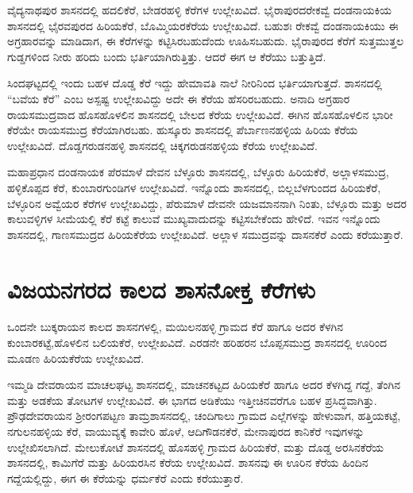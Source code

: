 ವೈದ್ಯನಾಥಪುರ ಶಾಸನದಲ್ಲಿ ಹದಲಿಕೆರೆ, ಬೇಡರಹಳ್ಳಿ ಕೆರೆಗಳ ಉಲ್ಲೇಖವಿದೆ. ಭೈರಾಪುರದ\break ರೇಕವ್ವೆ ದಂಡನಾಯಕಿಯ ಶಾಸನದಲ್ಲಿ ಭೈರವಪುರದ ಹಿರಿಯಕೆರೆ, ಬೊಮ್ಮಿಯರಕೆರೆಯ ಉಲ್ಲೇಖವಿದೆ. ಬಹುಶಃ ರೇಕವ್ವೆ ದಂಡನಾಯಕಿಯು ಈ ಅಗ್ರಹಾರವನ್ನು ಮಾಡಿದಾಗ, ಈ ಕೆರೆಗಳನ್ನು ಕಟ್ಟಿಸಿರಬಹುದೆಂದು ಊಹಿಸಬಹುದು. ಭೈರಾಪುರದ ಕೆರೆಗೆ ಸುತ್ತಮುತ್ತಲ ಗುಡ್ಡಗಳಿಂದ ನೀರು ಹರಿದು ಬಂದು ಭರ್ತಿಯಾಗಿರುತ್ತಿತ್ತು. ಆದರೆ ಈಗ ಆ ಕೆರೆಯು ಬತ್ತುತ್ತಿದೆ.

ಸಿಂದಘಟ್ಟದಲ್ಲಿ ಇಂದು ಬಹಳ ದೊಡ್ಡ ಕೆರೆ ಇದ್ದು ಹೇಮಾವತಿ ನಾಲೆ ನೀರಿನಿಂದ ಭರ್ತಿಯಾಗುತ್ತದೆ. ಶಾಸನದಲ್ಲಿ “ಬವೆಯ ಕೆರೆ” ಎಂಬ ಅಸ್ಪಷ್ಟ ಉಲ್ಲೇಖವಿದ್ದು ಅದೇ ಈ ಕೆರೆಯ ಹೆಸರಿರಬಹುದು. ಅನಾದಿ ಅಗ್ರಹಾರ ರಾಯಸಮುದ್ರವಾದ ಹೊಸಹೊಳಲಿನ ಶಾಸನದಲ್ಲಿ ಬೇಲದ ಕೆರೆಯ ಉಲ್ಲೇಖವಿದೆ. ಈಗಿನ ಹೊಸಹೊಳಲಿನ ಭಾರೀ ಕೆರೆಯೇ ರಾಯಸಮುದ್ರ ಕೆರೆಯಾಗಿರಬಹು. ಹುಸ್ಕೂರು ಶಾಸನದಲ್ಲಿ ಪೆರ್ಬಾಣನಹಳ್ಳಿಯ ಹಿರಿಯ ಕೆರೆಯ ಉಲ್ಲೇಖವಿದೆ. ದೊಡ್ಡಗರುಡನಹಳ್ಳಿ ಶಾಸನದಲ್ಲಿ ಚಿಕ್ಕಗರುಡನಹಳ್ಳಿಯ ಕೆರೆಯ ಉಲ್ಲೇಖವಿದೆ.

ಮಹಾಪ್ರಧಾನ ದಂಡನಾಯಕ ಪೆರಮಾಳೆ ದೇವನ ಬೆಳ್ಳೂರು ಶಾಸನದಲ್ಲಿ, ಬೆಳ್ಳೂರು ಹಿರಿಯಕೆರೆ, ಅಲ್ಲಾಳಸಮುದ್ರ, ಹಳ್ಳಿಕೊಪ್ಪದ ಕೆರೆ, ಕುಂಬಾರಗುಂಡಿಗಳ ಉಲ್ಲೇಖವಿದೆ. ಇನ್ನೊಂದು ಶಾಸನದಲ್ಲಿ, ಬಿಲ್ಲಬೆಳಗುಂದದ ಹಿರಿಯಕೆರೆ, ಬೆಳ್ಳೂರಿನ ಅವ್ವೆಯರ ಕೆರೆಗಳ ಉಲ್ಲೇಖವಿದ್ದು, ಪೆರುಮಾಳೆ ದೇವನೇ ಯಜಮಾನನಾಗಿ ನಿಂತು, ಬೆಳ್ಳೂರು ಮತ್ತು ಅದರ ಕಾಲುವಳ್ಳಿಗಳ ಸೀಮೆಯಲ್ಲಿ ಕೆರೆ ಕಟ್ಟೆ ಕಾಲುವೆ ಮುಖ್ಯವಾದುದನ್ನು ಕಟ್ಟಿಸಬೇಕೆಂದು ಹೇಳಿದೆ. ಇವನ ಇನ್ನೊಂದು ಶಾಸನದಲ್ಲಿ, ಗಾಣಸಮುದ್ರದ ಹಿರಿಯಕೆರೆಯ ಉಲ್ಲೇಖವಿದೆ. ಅಲ್ಲಾಳ ಸಮುದ್ರವನ್ನು ದಾಸನಕೆರೆ ಎಂದು ಕರೆಯುತ್ತಾರೆ.


\section{ವಿಜಯನಗರದ ಕಾಲದ ಶಾಸನೋಕ್ತ ಕೆರೆಗಳು}

ಒಂದನೇ ಬುಕ್ಕರಾಯನ ಕಾಲದ ಶಾಸನಗಳಲ್ಲಿ, ಮಯಿಲನಹಳ್ಳಿ ಗ್ರಾಮದ ಕೆರೆ ಹಾಗೂ ಅದರ ಕೆಳಗಿನ ಕುಂಬಾರಕಟ್ಟೆ,\break ಹೊಳಲಿನ ಬಲಿಯಕೆರೆ, ಉಲ್ಲೇಖವಿದೆ. ಎರಡನೇ ಹರಿಹರನ ಬೊಪ್ಪಸಮುದ್ರ ಶಾಸನದಲ್ಲಿ ಊರಿಂದ ಮೂಡಣ ಹಿರಿಯಕೆರೆಯ ಉಲ್ಲೇಖವಿದೆ.

ಇಮ್ಮಡಿ ದೇವರಾಯನ ಮಾಚಲಘಟ್ಟ ಶಾಸನದಲ್ಲಿ, ಮಾಚನಕಟ್ಟದ ಹಿರಿಯಕೆರೆ ಹಾಗೂ ಅದರ ಕೆಳಗಿದ್ದ ಗದ್ದೆ, ತೆಂಗಿನ ಮತ್ತು ಅಡಕೆಯ ತೋಟಗಳ ಉಲ್ಲೇಖವಿದೆ. ಈ ಭಾಗದ ಅಡಿಕೆಯು ಇತ್ತೀಚಿನವರೆಗೂ ಬಹಳ ಪ್ರಸಿದ್ಧವಾಗಿತ್ತು. ಪ್ರೌಢದೇವರಾಯನ ಶ‍್ರೀರಂಗಪಟ್ಟಣ ತಾಮ್ರಶಾಸನದಲ್ಲಿ, ಚಂದಿಗಾಲು ಗ್ರಾಮದ ಎಲ್ಲೆಗಳನ್ನು ಹೇಳುವಾಗ, ಹತ್ತಿಯಕಟ್ಟೆ, ನಗುಲನಹಳ್ಳಿಯ ಕೆರೆ, ವಾಯುವ್ಯಕ್ಕೆ ಕಾವೇರಿ ಹೊಳೆ, ಆದಿಗೌಡನಕೆರೆ, ಮೇನಾಪುರದ ಕಾನಿಕೆರೆ ಇವುಗಳನ್ನು ಉಲ್ಲೇಖಿಸಲಾಗಿದೆ. ಮೇಲುಕೋಟೆ ಶಾಸನದಲ್ಲಿ ಹೊಸಹಳ್ಳಿ ಗ್ರಾಮದ ಹಿರಿಯಕೆರೆ, ಮತ್ತು ದೊಡ್ಡ ಅರಸಿನಕೆರೆಯ ಶಾಸನದಲ್ಲಿ, ಕಾಮಿಗೆರೆ ಮತ್ತು ಹಿರಿಯರಸಿನ ಕೆರೆಯ ಉಲ್ಲೇಖವಿದೆ. ಶಾಸನವು ಈ ಊರಿನ ಕೆರೆಯ ಹಿಂದಿನ ಗದ್ದೆಯಲ್ಲಿದ್ದು, ಈಗ ಈ ಕೆರೆಯನ್ನು ಧರ್ಮಕೆರೆ ಎಂದು ಕರೆಯುತ್ತಾರೆ.

